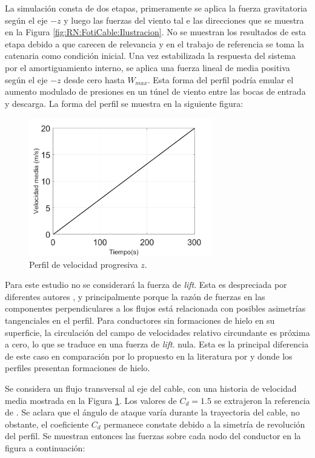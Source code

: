 La simulación consta de dos etapas, primeramente se aplica la fuerza gravitatoria según el eje $-z$  y luego las fuerzas del viento tal e las direcciones que se muestra en la Figura \ref{fig:RN:FotiCable:Ilustracion}. No se muestran los resultados de esta etapa debido a que carecen de relevancia y en el trabajo de referencia se toma la catenaria como condición inicial. Una vez estabilizada la respuesta del sistema por el amortiguamiento interno, se aplica una fuerza lineal de media positiva según el eje $-z$ desde cero hasta $W_{max}$. Esta forma del perfil podría emular el aumento modulado de presiones en un túnel de viento entre las bocas de entrada y descarga. La forma del perfil se muestra en la siguiente figura:
\begin{figure}[ht!]
	\centering
	\includegraphics[width=80mm]{./imagenes/ResultadosNumericos/SimpleCable/PerfilVm_TL_Foti.png}
	\caption{Perfil de velocidad progresiva $z$.}
	\label{fig:RN:FotiCable:VelocidadCable}
\end{figure}

Para este estudio no se considerará la fuerza de \textit{lift}. Esta es despreciada por diferentes autores \cite{lee1992nonlinear}, \cite{Foti2016} y \cite{Papailiou1997} principalmente porque la razón de fuerzas en las componentes perpendiculares a los flujos está relacionada con posibles asimetrías tangenciales en el perfil. Para conductores sin formaciones de hielo en su superficie, la circulación del campo de velocidades relativo circundante es próxima a cero, lo que se traduce en una fuerza de \textit{lift}. nula. Esta es la principal diferencia de este caso en comparación por lo propuesto en la literatura por \cite{luongo1984planar} y \cite{foti2018finite} donde los perfiles presentan formaciones de hielo.

Se considera un flujo transversal al eje del cable, con una historia de velocidad media mostrada en la Figura \ref{fig:RN:FotiCable:VelocidadCable}. Los valores de $C_d=1.5$ se extrajeron la referencia de \cite{foti2018finite}. Se aclara que el ángulo de ataque varía durante la trayectoria del cable, no obstante, el coeficiente $C_d$ permanece constate debido a la simetría de revolución del perfil. Se muestran entonces las fuerzas sobre cada nodo del conductor en la figura a continuación:


